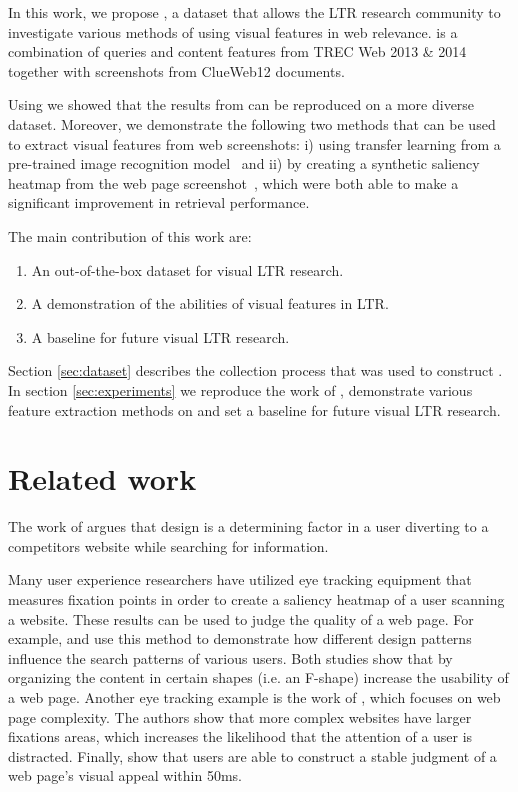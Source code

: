 In this work, we propose \datasetname, a dataset that allows the LTR research community to investigate various methods of using visual features in web relevance. \datasetname is a combination of queries and content features from TREC Web 2013 \& 2014 together with screenshots from ClueWeb12 documents. 

Using \datasetname we showed that the results from \citet{fan2017learning} can be reproduced on a more diverse dataset. Moreover, we demonstrate the following two methods that can be used to extract visual features from web screenshots: i) using transfer learning from a pre-trained image recognition model~\cite{donahue2014decaf}\cite{simonyan2014very} and ii) by creating a synthetic saliency heatmap from the web page screenshot~\cite{shen2014webpage}\cite{shan2017two}, which were both able to make a significant improvement in retrieval performance. 

The main contribution of this work are:
\begin{enumerate}  
\item An out-of-the-box dataset for visual LTR research.
\item A demonstration of the abilities of visual features in LTR.
\item A baseline for future visual LTR research.
\end{enumerate}

Section \ref{sec:dataset} describes the collection process that was used to construct \datasetname. In section \ref{sec:experiments} we reproduce the work of \citet{fan2017learning}, demonstrate various feature extraction methods on \datasetname and set a baseline for future visual LTR research.  
\section{Related work}\label{sec:relatedwork}
The work of \citet{nielsen1999designing} argues that design is a determining factor in a user diverting to a competitors website while searching for information.

Many user experience researchers have utilized eye tracking equipment that measures fixation points in order to create a saliency heatmap of a user scanning a website. These results can be used to judge the quality of a web page. For example, \citet{nielsen2006f} and \citet{pernice2017f} use this method to demonstrate how different design patterns influence the search patterns of various users. Both studies show that by organizing the content in certain shapes (i.e. an F-shape) increase the usability of a web page. Another eye tracking example is the work of \citet{wang2014eye}, which focuses on web page complexity. The authors show that more complex websites have larger fixations areas, which increases the likelihood that the attention of a user is distracted. Finally, \citet{lindgaard2006attention} show that users are able to construct a stable judgment of a web page's visual appeal within 50ms. 

